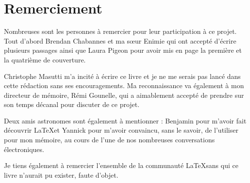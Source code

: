 \section*{Remerciement}\thispagestyle{plain}

Nombreuses sont les personnes à remercier pour leur participation à ce projet. Tout d'abord Brendan Chabannes et ma sœur Enimie qui ont accepté d'écrire plusieurs passages ainsi que Laura Pigeon pour avoir mis en page la première et la quatrième de couverture.

Christophe Masutti m'a incité à écrire ce livre et je ne me serais pas lancé dans cette rédaction sans ses encouragements. Ma reconnaissance va également à mon directeur de mémoire, Rémi Gounelle, qui a aimablement accepté de prendre sur son temps décanal pour discuter de ce projet.

Deux amis astronomes sont également à mentionner : Benjamin pour m'avoir fait découvrir  \LaTeX et Yannick pour m'avoir convaincu, sans le savoir, de l'utiliser pour mon mémoire, au cours de l'une de nos nombreuses conversations électroniques.

Je tiens également à remercier l'ensemble de la communauté \LaTeX sans qui ce livre n'aurait pu exister, faute d'objet. 

